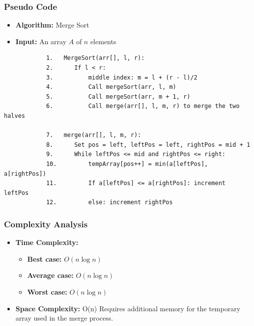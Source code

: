     \subsubsection{Pseudo Code}
        \begin{itemize}
            \item \textbf{Algorithm:} Merge Sort
            \item \textbf{Input:} An array $A$ of $n$ elements
        \end{itemize}
        \begin{verbatim}
            1.   MergeSort(arr[], l, r):
            2.      If l < r:
            3.          middle index: m = l + (r - l)/2
            4.          Call mergeSort(arr, l, m)
            5.          Call mergeSort(arr, m + 1, r)
            6.          Call merge(arr[], l, m, r) to merge the two halves

            7.   merge(arr[], l, m, r):
            8.      Set pos = left, leftPos = left, rightPos = mid + 1
            9.      While leftPos <= mid and rightPos <= right:
            10.         tempArray[pos++] = min(a[leftPos], a[rightPos])
            11.         If a[leftPos] <= a[rightPos]: increment leftPos
            12.         else: increment rightPos
        \end{verbatim}
    \subsubsection{Complexity Analysis}
        \begin{itemize}
            \item \textbf{Time Complexity:}
            \begin{itemize}
                \item \textbf{Best case:} $O(n \log n)$
                \item \textbf{Average case:} $O(n \log n)$
                \item \textbf{Worst case:} $O(n \log n)$ 
            \end{itemize}
            \item \textbf{Space Complexity:} O(n) 
                \subitem Requires additional memory for the temporary array used in the merge process.
        \end{itemize}
        
